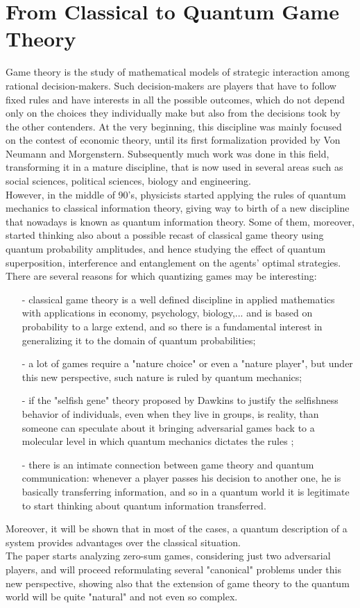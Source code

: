 \hfill

\section{From Classical to Quantum Game Theory}
Game theory is the study of mathematical models of strategic interaction among rational decision-makers. Such decision-makers are players that have to follow fixed rules and have interests in all the possible outcomes, which do not depend only on the choices they individually make but also from the decisions took by the other contenders. At the very beginning, this discipline was mainly focused on the contest of economic theory, until its first formalization provided by Von Neumann and Morgenstern. Subsequently much work was done in this field, transforming it in a mature discipline, that is now used in several areas such as social sciences, political sciences, biology and engineering.\\
However, in the middle of 90's, physicists started applying the rules of quantum mechanics to classical information theory, giving way to birth of a new discipline that nowadays is known as quantum information theory. Some of them, moreover, started thinking also about a possible recast of classical game theory using quantum probability amplitudes, and hence studying the effect of quantum superposition, interference and entanglement on the agents’ optimal strategies.\\
There are several reasons for which quantizing games may be interesting:
\begin{itemize}[noitemsep]
	\item[-] classical game theory is a well defined discipline in applied mathematics with applications in economy, psychology, biology,... and is based on probability to a large extend, and so there is a fundamental interest in generalizing it to the domain of quantum probabilities;
	\item[-] a lot of games require a "nature choice" or even a "nature player", but under this new perspective, such nature is ruled by quantum mechanics;
	\item[-] if the "selfish gene" theory proposed by Dawkins to justify the selfishness behavior of individuals, even when they live in groups, is reality, than someone can speculate about it bringing adversarial games back to a molecular level in which quantum mechanics dictates the rules \cite{ozhigov2013quantum};
	\item[-] there is an intimate connection between game theory and quantum communication: whenever a player passes his decision to another one, he is basically transferring information, and so in a quantum world it is legitimate to start thinking about quantum information transferred. 
\end{itemize} 
Moreover, it will be shown that in most of the cases, a quantum description of a system provides
advantages over the classical situation.\\
The paper starts analyzing zero-sum games, considering just two adversarial players, and will proceed reformulating several "canonical" problems under this new perspective, showing also that the extension of game theory to the quantum world will be quite "natural" and not even so complex. 
